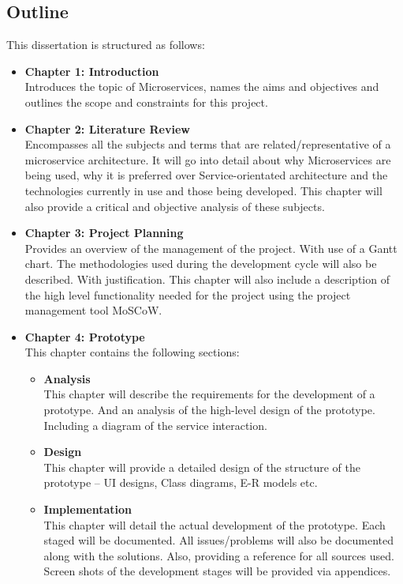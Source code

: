 	\subsection{Outline}
	This dissertation is structured as follows:
		\begin{itemize}\itemsep0pt
			\item \textbf{Chapter 1: Introduction}
			\\Introduces the topic of Microservices, names the aims and objectives and outlines the scope and constraints for this project.
			\item \textbf{Chapter 2: Literature Review}
			\\Encompasses all the subjects and terms that are related/representative of a microservice architecture. It will go into detail about why Microservices are being used, why it is preferred over Service-orientated architecture and the technologies currently in use and those being developed. This chapter will also provide a critical and objective analysis of these subjects. 
			\item \textbf{Chapter 3: Project Planning}
			\\Provides an overview of the management of the project. With use of a Gantt chart. The methodologies used during the development cycle will also be described. With justification. This chapter will also include a description of the high level functionality needed for the project using the project management tool MoSCoW.
			\item \textbf{Chapter 4: Prototype} 
			\\ This chapter contains the following sections:
				\begin{itemize}
					\item \textbf{Analysis}
					\\This chapter will describe the requirements for the development of a prototype. And an analysis of the high-level design of the prototype. Including a diagram of the service interaction.
					\item \textbf{Design}
					\\This chapter will provide a detailed design of the structure of the prototype – UI designs, Class diagrams, E-R models etc.
					\item \textbf{Implementation}
					\\This chapter will detail the actual development of the prototype. Each staged will be documented. All issues/problems will also be documented along with the solutions. Also, providing a reference for all sources used. Screen shots of the development stages will be provided via appendices.

\end{itemize}
\end{itemize}
